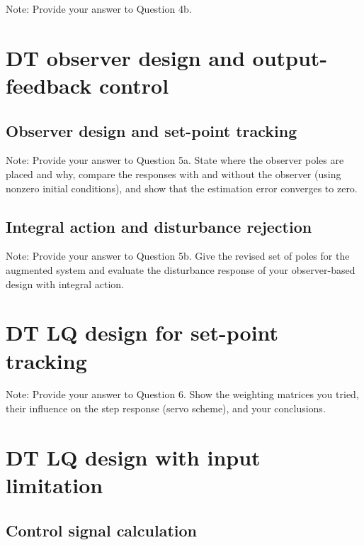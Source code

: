 \documentclass{article}
\begin{document}
{\color{red}Note: Provide your answer to Question 4b.}


\section{DT observer design and output-feedback control}

\subsection{Observer design and set-point tracking}

{\color{red}Note: Provide your answer to Question 5a. State where the observer poles are placed and why, compare the responses with and without the observer (using nonzero initial conditions), and show that the estimation error converges to zero.}

\subsection{Integral action and disturbance rejection}

{\color{red}Note: Provide your answer to Question 5b. Give the revised set of poles for the augmented system and evaluate the disturbance response of your observer-based design with integral action.}


\section{DT LQ design for set-point tracking}

{\color{red}Note: Provide your answer to Question 6. Show the weighting matrices you tried, their influence on the step response (servo scheme), and your conclusions.}

\section{DT LQ design with input limitation}

\subsection{Control signal calculation}
\end{document}
